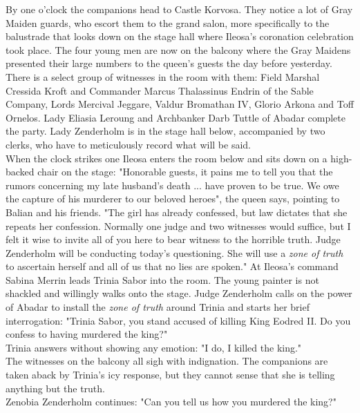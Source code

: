 By one o'clock the companions head to Castle Korvosa. They notice a lot of Gray Maiden guards, who escort them to the grand salon, more specifically to the balustrade that looks down on the stage hall where Ileosa's coronation celebration took place. The four young men are now on the balcony where the Gray Maidens presented their large numbers to the queen's guests the day before yesterday. There is a select group of witnesses in the room with them: Field Marshal Cressida Kroft and Commander Marcus Thalassinus Endrin of the Sable Company, Lords Mercival Jeggare, Valdur Bromathan IV, Glorio Arkona and Toff Ornelos. Lady Eliasia Leroung and Archbanker Darb Tuttle of Abadar complete the party. Lady Zenderholm is in the stage hall below, accompanied by two clerks, who have to meticulously record what will be said.\\

When the clock strikes one Ileosa enters the room below and sits down on a high-backed chair on the stage: "Honorable guests, it pains me to tell you that the rumors concerning my late husband's death ... have proven to be true. We owe the capture of his murderer to our beloved heroes", the queen says, pointing to Balian and his friends. "The girl has already confessed, but law dictates that she repeats her confession. Normally one judge and two witnesses would suffice, but I felt it wise to invite all of you here to bear witness to the horrible truth. Judge Zenderholm will be conducting today's questioning. She will use a {\itshape zone of truth} to ascertain herself and all of us that no lies are spoken." At Ileosa's command Sabina Merrin leads Trinia Sabor into the room. The young painter is not shackled and willingly walks onto the stage. Judge Zenderholm calls on the power of Abadar to install the {\itshape zone of truth} around Trinia and starts her brief interrogation: "Trinia Sabor, you stand accused of killing King Eodred II. Do you confess to having murdered the king?"\\

Trinia answers without showing any emotion: "I do, I killed the king."\\

The witnesses on the balcony all sigh with indignation. The companions are taken aback by Trinia's icy response, but they cannot sense that she is telling anything but the truth.\\

Zenobia Zenderholm continues: "Can you tell us how you murdered the king?"\\

